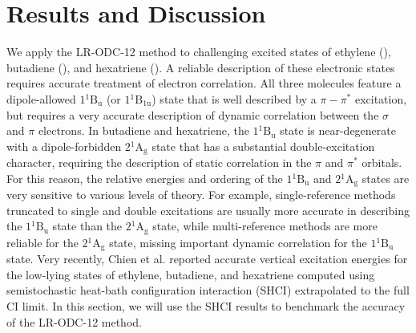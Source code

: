 \section{Results and Discussion}
\label{sec:alkenes}


We apply the LR-ODC-12 method to challenging excited states of ethylene
(), butadiene (), and hexatriene ().  A reliable
description of these electronic states requires accurate treatment of electron
correlation.\cite{%
    Tavan:1986p6602, Tavan:1987p4337, Nakayama:1998p157,
    Davidson:1996p6161, Watts:1998p6979, Muller:1999p7176, Li:1999p177,
    Starcke:2006p39, Kurashige:2004p425, Ghosh:2008p144117, Sokolov:2017p244102,
    Schreiber:2008p134110, Zgid:2009p194107, Angeli:2010p2436, Daday:2012p4441,
    Watson:2012p4013, Zimmerman:2017p4712%
}
All three molecules feature a dipole-allowed $1{}^1\mathrm{B_{u}}$ (or
$1{}^1\mathrm{B_{1u}}$) state that is well described by a $\pi-\pi^*$
excitation, but requires a very accurate description of dynamic correlation
between the $\sigma$ and $\pi$ electrons.
In butadiene and hexatriene, the $1{}^1\mathrm{B_{u}}$ state is near-degenerate
with a dipole-forbidden $2{}^1\mathrm{A_{g}}$ state that has a substantial
double-excitation character, requiring the description of static correlation in
the $\pi$ and $\pi^*$
orbitals.\cite{Kurashige:2004p425,Ghosh:2008p144117,Sokolov:2017p244102}
For this reason, the relative energies and ordering of the $1{}^1\mathrm{B_{u}}$
and $2{}^1\mathrm{A_{g}}$ states are very sensitive to various levels of theory.
For example, single-reference methods truncated to single and double excitations
are usually more accurate in describing the $1{}^1\mathrm{B_{u}}$ state than the
$2{}^1\mathrm{A_{g}}$ state, while multi-reference methods are more reliable for
the $2{}^1\mathrm{A_{g}}$ state, missing important dynamic correlation for the
$1{}^1\mathrm{B_{u}}$ state.
Very recently, Chien et al.\cite{Chien:2018p2714} reported accurate vertical
excitation energies for the low-lying states of ethylene, butadiene, and
hexatriene computed using semistochastic heat-bath configuration interaction
(SHCI) extrapolated to the full CI limit.
In this section, we will use the SHCI results to benchmark the accuracy of the
LR-ODC-12 method.


